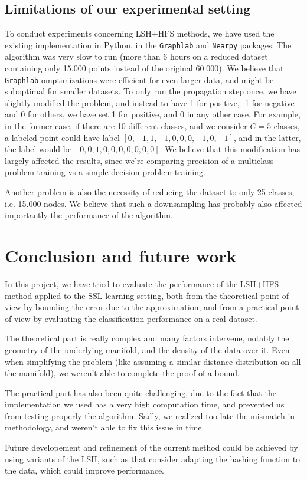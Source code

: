 \documentclass{article} %
\begin{document}
\subsection{Limitations of our experimental setting}
To conduct experiments concerning LSH+HFS methods, we have used the existing implementation in Python, in the \texttt{Graphlab} and \texttt{Nearpy} packages. The algorithm was very slow to run (more than 6 hours on a reduced dataset containing only 15.000 points instead of the original 60.000). We believe that \texttt{Graphlab} omptimizations were efficient for even larger data, and might be suboptimal for smaller datasets. To only run the propagation step once, we have slightly modified the problem, and instead to have 1 for positive, -1 for negative and 0 for others, we have set 1 for positive, and 0 in any other case. For example, in the former case, if there are 10 different classes, and we consider $C=5$ classes, a labeled point could have label $[0, -1, 1, -1, 0, 0, 0, -1, 0, -1]$, and in the latter, the label would be $[0, 0, 1, 0, 0, 0, 0, 0, 0, 0]$. We believe that this modification has largely affected the results, since we're comparing precision of a multiclass problem training vs a simple decision problem training.

Another problem is also the necessity of reducing the dataset to only 25 classes, i.e. 15.000 nodes. We believe that such a downsampling has probably also affected importantly the performance of the algorithm.

\section{Conclusion and future work}

In this project, we have tried to evaluate the performance of the LSH+HFS method applied to the SSL learning setting, both from the theoretical point of view by bounding the error due to the approximation, and from a practical point of view by evaluating the classification performance on a real dataset.

The theoretical part is really complex and many factors intervene, notably the geometry of the underlying manifold, and the density of the data over it. Even when simplifying the problem (like assuming a similar distance distribution on all the manifold), we weren't able to complete the proof of a bound.

The practical part has also been quite challenging, due to the fact that the implementation we used has a very high computation time, and prevented us from testing properly the algorithm. Sadly, we realized too late the mismatch in methodology, and weren't able to fix this issue in time.

Future developement and refinement of the current method could be achieved by using variants of the LSH, such as \cite{andoni2015optimal, andoni2014beyond} that consider adapting the hashing function to the data, which could improve performance. 


\end{document}
